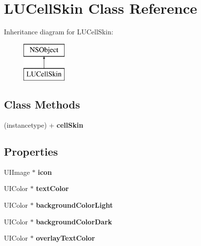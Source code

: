 \hypertarget{interface_l_u_cell_skin}{}\section{L\+U\+Cell\+Skin Class Reference}
\label{interface_l_u_cell_skin}
Inheritance diagram for L\+U\+Cell\+Skin\+:\begin{figure}[H]
\begin{center}
\leavevmode
\includegraphics[height=2.000000cm]{interface_l_u_cell_skin}
\end{center}
\end{figure}
\subsection*{Class Methods}
\begin{DoxyCompactItemize}
\item 
\mbox{\label{interface_l_u_cell_skin_a830e3b0fe6ae4279c0fa0051ba373eea}} 
(instancetype) + {\bfseries cell\+Skin}
\end{DoxyCompactItemize}
\subsection*{Properties}
\begin{DoxyCompactItemize}
\item 
\mbox{\label{interface_l_u_cell_skin_a44c2deaf285de26d41bc867257f947f1}} 
U\+I\+Image $\ast$ {\bfseries icon}
\item 
\mbox{\label{interface_l_u_cell_skin_a5531b3ae62527fdc2c35583fd1e7f48b}} 
U\+I\+Color $\ast$ {\bfseries text\+Color}
\item 
\mbox{\label{interface_l_u_cell_skin_acc45bf6f92ad53828758a6bc13699a34}} 
U\+I\+Color $\ast$ {\bfseries background\+Color\+Light}
\item 
\mbox{\label{interface_l_u_cell_skin_acc90db1586ee3415e7ba57a2f1399e85}} 
U\+I\+Color $\ast$ {\bfseries background\+Color\+Dark}
\item 
\mbox{\label{interface_l_u_cell_skin_accd62b2474721159cf8256838bc1a04f}} 
U\+I\+Color $\ast$ {\bfseries overlay\+Text\+Color}
\end{DoxyCompactItemize}


